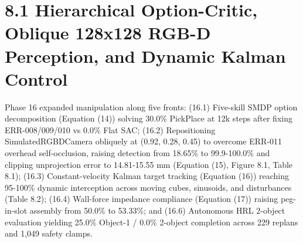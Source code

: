 \documentclass[11pt,a4paper,oneside]{book}
\begin{document}
\section{8.1 Hierarchical Option-Critic, Oblique 128x128 RGB-D Perception, and Dynamic Kalman Control}
Phase 16 expanded manipulation along five fronts: (16.1) Five-skill SMDP option decomposition (Equation (14)) solving 30.0\% PickPlace at 12k steps after fixing ERR-008/009/010 vs 0.0\% Flat SAC; (16.2) Repositioning SimulatedRGBDCamera obliquely at (0.92, 0.28, 0.45) to overcome ERR-011 overhead self-occlusion, raising detection from 18.65\% to 99.9-100.0\% and clipping unprojection error to 14.81-15.55 mm (Equation (15), Figure 8.1, Table 8.1); (16.3) Constant-velocity Kalman target tracking (Equation (16)) reaching 95-100\% dynamic interception across moving cubes, sinusoids, and disturbances (Table 8.2); (16.4) Wall-force impedance compliance (Equation (17)) raising peg-in-slot assembly from 50.0\% to 53.33\%; and (16.6) Autonomous HRL 2-object evaluation yielding 25.0\% Object-1 / 0.0\% 2-object completion across 229 replans and 1,049 safety clamps.
\end{document}
